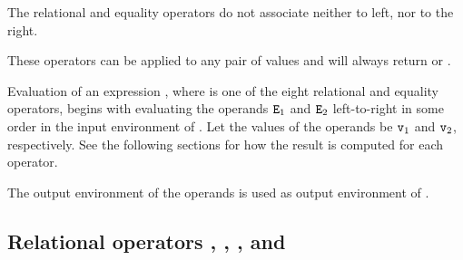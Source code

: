 \label{section:relational}

The relational and equality operators do not associate neither to left,
nor to the right.

These operators can be applied to any pair of values and will always
return  or .

\SYNTAX

\begin{rules}
       {   \OR
           \OR
        }


\end{rules}

\EVALUATION

Evaluation of an expression , where  is
one of the eight relational and equality operators, begins with evaluating
the operands ${\tt{\sl E}}_1$ and ${\tt{\sl E}}_2$
\ifStd left-to-right \fi \ifOld in some order \fi
in the input environment
of .  Let the values of
the operands be ${\tt{\sl v}}_1$ and ${\tt{\sl v}}_2$, respectively.
See the following sections for how the result is computed for each
operator.

\ENVIRONMENTS

The output environment of the operands is used as output environment of
.

\subsection{Relational operators \T{<}, \T{=<}, \T{>}, and \T{>=}}

\label{section:relationalops}

